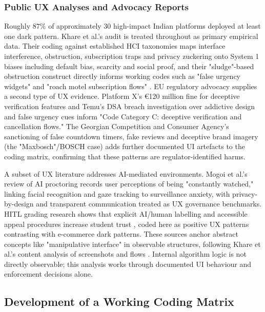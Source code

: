\documentclass[11pt]{article}
\begin{document}
\subsubsection{Public UX Analyses and Advocacy Reports}
\label{sec:public_ux_advocacy_reports} Roughly $87\%$ of approximately $30$ high-impact Indian platforms deployed at least one dark pattern. Khare et al.'s audit \parencites[7]{6295677} is treated throughout as primary empirical data. Their coding against established HCI taxonomies maps interface interference, obstruction, subscription traps and privacy zuckering onto System 1 biases including default bias, scarcity and social proof, and their "sludge"-based obstruction construct directly informs working codes such as "false urgency widgets" and "roach motel subscription flows" \parencites[7]{6295677}. EU regulatory advocacy supplies a second type of UX evidence. Platform X's €120 million fine for deceptive verification features and Temu's DSA breach investigation over addictive design and false urgency cues \parencites[390]{7896734} inform "Code Category C: deceptive verification and cancellation flows." The Georgian Competition and Consumer Agency's sanctioning \parencites[390]{7896734} of false countdown timers, fake reviews and deceptive brand imagery (the "Maxbosch"/BOSCH case) adds further documented UI artefacts to the coding matrix, confirming that these patterns are regulator-identified harms.

A subset of UX literature addresses AI-mediated environments. Mogoi et al.'s review of AI proctoring \parencites{2055956} records user perceptions of being "constantly watched," linking facial recognition and gaze tracking to surveillance anxiety, with privacy-by-design and transparent communication treated as UX governance benchmarks. HITL grading research shows that explicit AI/human labelling and accessible appeal procedures increase student trust \parencites{6805789}, coded here as positive UX patterns contrasting with e-commerce dark patterns. These sources anchor abstract concepts like "manipulative interface" in observable structures, following Khare et al.'s content analysis of screenshots and flows \parencites[7]{6295677}[10]{8200246}. Internal algorithm logic is not directly observable; this analysis works through documented UI behaviour and enforcement decisions alone.

\subsection{Development of a Working Coding Matrix}
\end{document}
